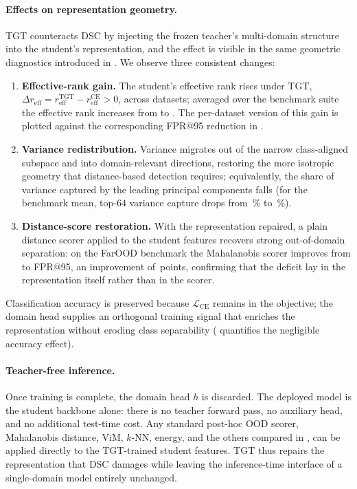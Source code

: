 \paragraph{Effects on representation geometry.}
TGT counteracts DSC by injecting the frozen teacher's multi-domain structure into the student's representation, and the effect is visible in the same geometric diagnostics introduced in . We observe three consistent changes:
\begin{enumerate}
  \item \textbf{Effective-rank gain.} The student's effective rank rises under TGT, $\Delta r_{\mathrm{eff}} = r_{\mathrm{eff}}^{\mathrm{TGT}} - r_{\mathrm{eff}}^{\mathrm{CE}} > 0$, across datasets; averaged over the benchmark suite the effective rank increases from  to . The per-dataset version of this gain is plotted against the corresponding FPR@95 reduction in .
  \item \textbf{Variance redistribution.} Variance migrates out of the narrow class-aligned subspace and into domain-relevant directions, restoring the more isotropic geometry that distance-based detection requires; equivalently, the share of variance captured by the leading principal components falls (for the benchmark mean, top-$64$ variance capture drops from \,\% to \,\%).
  \item \textbf{Distance-score restoration.} With the representation repaired, a plain distance scorer applied to the student features recovers strong out-of-domain separation: on the FarOOD benchmark the Mahalanobis scorer improves from  to  FPR@95, an improvement of \,points, confirming that the deficit lay in the representation itself rather than in the scorer.
\end{enumerate}
Classification accuracy is preserved because $\mathcal{L}_{\mathrm{CE}}$ remains in the objective; the domain head supplies an orthogonal training signal that enriches the representation without eroding class separability ( quantifies the negligible accuracy effect).

\paragraph{Teacher-free inference.}
Once training is complete, the domain head $h$ is discarded. The deployed model is the student backbone alone: there is no teacher forward pass, no auxiliary head, and no additional test-time cost. Any standard post-hoc OOD scorer, Mahalanobis distance, ViM, $k$-NN, energy, and the others compared in , can be applied directly to the TGT-trained student features. TGT thus repairs the representation that DSC damages while leaving the inference-time interface of a single-domain model entirely unchanged.

